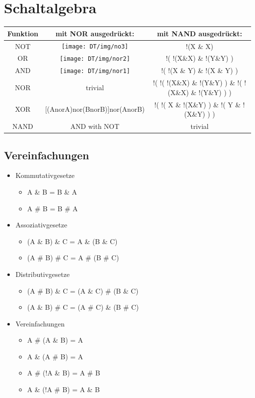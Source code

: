 \section*{Schaltalgebra}

\begin{tabular}{|c|c|c|}
\hline 
Funktion & mit NOR ausgedrückt: & mit NAND ausgedrückt:\tabularnewline
\hline 
\hline 
NOT & \texttt{[image: DT/img/no3]} & !(X \& X)\tabularnewline
\hline 
OR & \texttt{[image: DT/img/nor2]} & !( !(X\&X) \& !(Y\&Y) )\tabularnewline
\hline 
AND & \texttt{[image: DT/img/nor1]} & !( !(X \& Y) \& !(X \& Y) )\tabularnewline
\hline 
NOR & trivial & !( !( !(X\&X) \& !(Y\&Y) ) \& !( !(X\&X) \& !(Y\&Y) ) )\tabularnewline
\hline 
XOR & {[}(AnorA)nor(BnorB){]}nor(AnorB) & !( !( X \& !(X\&Y) ) \& !( Y \& !(X\&Y) ) )\tabularnewline
\hline 
NAND & AND with NOT & trivial\tabularnewline
\hline 
\end{tabular}


\subsection*{Vereinfachungen}
\begin{itemize}
\item Kommutativgesetze

\begin{itemize}
\item A \& B = B \& A 
\item A \# B = B \# A 
\end{itemize}
\item Assoziativgesetze 

\begin{itemize}
\item (A \& B) \& C = A \& (B \& C) 
\item (A \# B) \# C = A \# (B \# C) 
\end{itemize}
\item Distributivgesetze 

\begin{itemize}
\item (A \# B) \& C = (A \& C) \# (B \& C) 
\item (A \& B) \# C = (A \# C) \& (B \# C)
\end{itemize}
\item Vereinfachungen

\begin{itemize}
\item A \# (A \& B) = A
\item A \& (A \# B) = A
\item A \# (!A \& B) = A \# B
\item A \& (!A \# B) = A \& B
\end{itemize}
\end{itemize}

